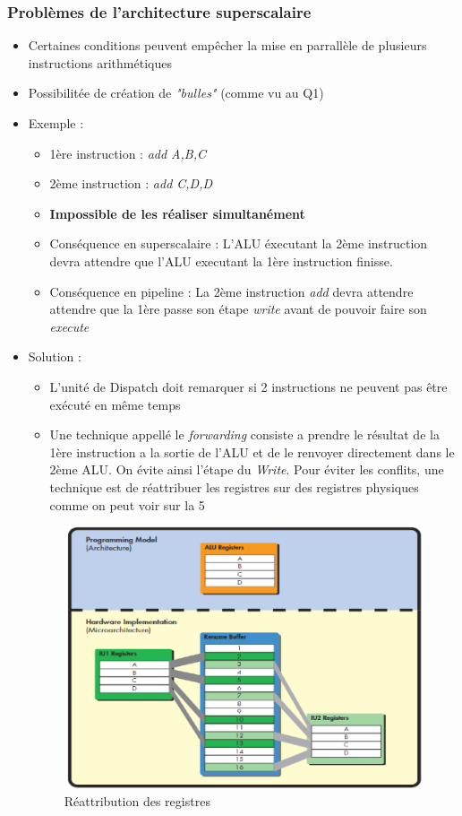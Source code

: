 \documentclass[a4paper]{article}
\begin{document}
    \subsubsection{Problèmes de l'architecture superscalaire}
    \begin{itemize}
      \item Certaines conditions peuvent empêcher la mise en parrallèle de plusieurs instructions arithmétiques
      \item Possibilitée de création de \emph{"bulles"} (comme vu au Q1)
      \item Exemple : 
      \begin{itemize}
        \item 1ère instruction : \emph{add A,B,C}
        \item 2ème instruction : \emph{add C,D,D}
        \item \textbf{Impossible de les réaliser simultanément}
        \item Conséquence en superscalaire : L'ALU éxecutant la 2ème instruction devra attendre que l'ALU executant la 1ère instruction finisse.
        \item Conséquence en pipeline : La 2ème instruction \emph{add} devra attendre attendre que la 1ère passe son étape \emph{write} avant de pouvoir faire son \emph{execute}
      \end{itemize}
      \item Solution :
      \begin{itemize}
        \item L'unité de Dispatch doit remarquer si 2 instructions ne peuvent pas être exécuté en même temps
        \item Une technique appellé le \emph{forwarding} consiste a prendre le résultat de la 1ère instruction a la sortie de l'ALU et de le renvoyer directement dans le 2ème ALU.
        On évite ainsi l'étape du \emph{Write}. Pour éviter les conflits, une technique est de réattribuer les registres sur des registres physiques comme on peut voir sur la \figurename{5}
      \end{itemize}

      \begin{figure}[H]
        \centering
        \includegraphics[width = 0.5 \textwidth]{images/6.PNG}
        \caption{Réattribution des registres}
      \end{figure}


\end{itemize}
\end{document}
